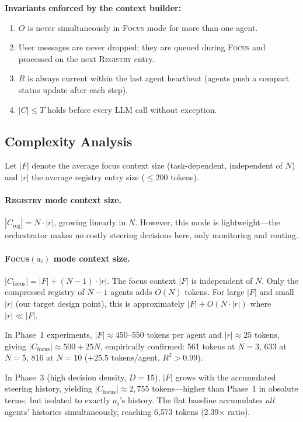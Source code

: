 \documentclass{article}
\begin{document}
\noindent\textbf{Invariants enforced by the context builder:}
\begin{enumerate}
  \item $O$ is never simultaneously in \textsc{Focus} mode for more than
  one agent. \label{inv:1}
  \item User messages are never dropped; they are queued during
  \textsc{Focus} and processed on the next \textsc{Registry} entry.
  \item $R$ is always current within the last agent heartbeat (agents push
  a compact status update after each step). \label{inv:3}
  \item $|C| \leq T$ holds before every LLM call without exception. \label{inv:4}
\end{enumerate}

\subsection{Complexity Analysis}
\label{sec:complexity}

Let $|F|$ denote the average focus context size (task-dependent, independent
of $N$) and $|r|$ the average registry entry size ($\leq 200$ tokens).

\paragraph{\textsc{Registry} mode context size.}
$|C_{\text{reg}}| = N \cdot |r|$, growing linearly in $N$.
However, this mode is lightweight—the orchestrator makes no costly
steering decisions here, only monitoring and routing.

\paragraph{\textsc{Focus}$(a_i)$ mode context size.}
$|C_{\text{focus}}| = |F| + (N-1) \cdot |r|$.
The focus context $|F|$ is independent of $N$.
Only the compressed registry of $N-1$ agents adds $O(N)$ tokens.
For large $|F|$ and small $|r|$ (our target design point), this is
approximately $|F| + O(N \cdot |r|)$ where $|r| \ll |F|$.

In Phase~1 experiments, $|F| \approx 450$--$550$ tokens per agent and
$|r| \approx 25$ tokens, giving $|C_{\text{focus}}| \approx 500 + 25N$,
empirically confirmed: 561 tokens at $N=3$, 633 at $N=5$, 816 at $N=10$
($+25.5$ tokens/agent, $R^2 > 0.99$).

In Phase~3 (high decision density, $D=15$), $|F|$ grows with the
accumulated steering history, yielding $|C_{\text{focus}}| \approx 2{,}755$
tokens—higher than Phase~1 in absolute terms, but isolated to exactly
$a_i$'s history.
The flat baseline accumulates \emph{all} agents' histories simultaneously,
reaching 6{,}573 tokens (2.39$\times$ ratio).
\end{document}
